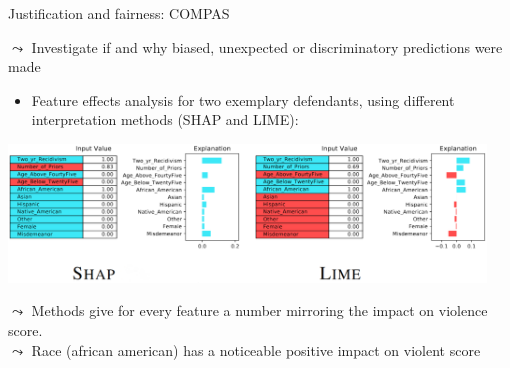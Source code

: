 \documentclass[11pt,compress,t,notes=noshow, aspectratio=169, xcolor=table]{beamer}
\begin{document}
\begin{frame}{Justification and fairness: COMPAS }

    $\leadsto$ Investigate if and why biased, unexpected or discriminatory predictions were made 
    \begin{itemize}
        \item Feature effects analysis for two exemplary defendants, using different interpretation methods (SHAP and LIME):
    \end{itemize}

    \medskip
    \centering
    \includegraphics[width=0.95\textwidth]{figure/COMPAS_shap_lime_example.png}

    \medskip
    \raggedright
    $\leadsto$ Methods give for every feature a number mirroring the impact on violence score. \\
    $\leadsto$ Race (african american) has a noticeable positive impact on violent score
\end{frame}









\end{document}
